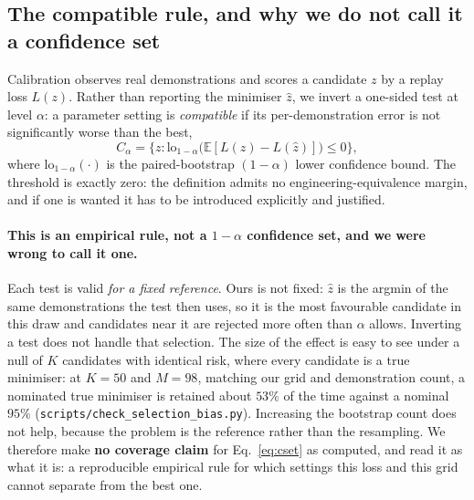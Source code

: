 \documentclass[pdflatex,iicol,sn-apa]{sn-jnl}
\theoremstyle{remark}
\begin{document}
\subsection{The compatible rule, and why we do not call it a confidence set}\label{subsec3_2}

Calibration observes real demonstrations and scores a candidate $z$ by a replay loss $L(z)$. Rather
than reporting the minimiser $\hat z$, we invert a one-sided test at level $\alpha$: a parameter
setting is \emph{compatible} if its per-demonstration error is not significantly worse than the
best,
\begin{equation}\label{eq:cset}
C_\alpha = \Big\{ z : \mathrm{lo}_{1-\alpha}\big( \mathbb{E}[L(z) - L(\hat z)] \big) \le 0 \Big\},
\end{equation}
where $\mathrm{lo}_{1-\alpha}(\cdot)$ is the paired-bootstrap $(1-\alpha)$ lower confidence bound.
The threshold is exactly zero: the definition admits no engineering-equivalence margin, and if one
is wanted it has to be introduced explicitly and justified.

\paragraph{This is an empirical rule, not a $1-\alpha$ confidence set, and we were wrong to call it
one.} Each test is valid \emph{for a fixed reference}. Ours is not fixed: $\hat z$ is the argmin of
the same demonstrations the test then uses, so it is the most favourable candidate in this draw and
candidates near it are rejected more often than $\alpha$ allows. Inverting a test does not handle
that selection. The size of the effect is easy to see under a null of $K$ candidates with identical
risk, where every candidate is a true minimiser: at $K = 50$ and $M = 98$, matching our grid and
demonstration count, a nominated true minimiser is retained about $53\%$ of the time against a
nominal $95\%$ (\texttt{scripts/check\_selection\_bias.py}). Increasing the bootstrap count does not
help, because the problem is the reference rather than the resampling. We therefore make \textbf{no
coverage claim} for Eq.~\eqref{eq:cset} as computed, and read it as what it is: a reproducible
empirical rule for which settings this loss and this grid cannot separate from the best one.
\end{document}
